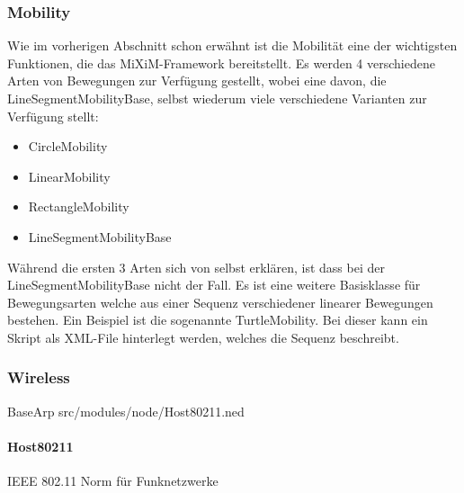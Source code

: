 \subsubsection{Mobility}

Wie im vorherigen Abschnitt schon erwähnt ist die Mobilität eine der wichtigsten Funktionen, die das MiXiM-Framework bereitstellt. Es werden 4 verschiedene Arten von Bewegungen zur Verfügung gestellt, wobei eine davon, die LineSegmentMobilityBase, selbst wiederum viele verschiedene Varianten zur Verfügung stellt: 
\begin{itemize}
\item CircleMobility
\item LinearMobility
\item RectangleMobility
\item LineSegmentMobilityBase
\end{itemize}
Während die ersten 3 Arten sich von selbst erklären, ist dass bei der LineSegmentMobilityBase nicht der Fall. Es ist eine weitere Basisklasse für Bewegungsarten welche aus einer Sequenz verschiedener linearer Bewegungen bestehen. Ein Beispiel ist die sogenannte TurtleMobility. Bei dieser kann ein Skript als XML-File hinterlegt werden, welches die Sequenz beschreibt.

\subsubsection{Wireless}

BaseArp
src/modules/node/Host80211.ned

\paragraph{Host80211}

IEEE 802.11
Norm für Funknetzwerke






